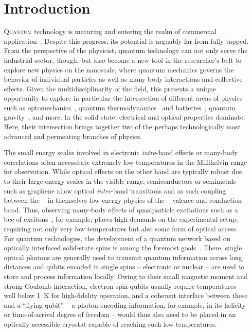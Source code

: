 \chapter{Introduction}\label{ch:setup:introduction}
\lettrine[lines=3,lhang=0.33,loversize=0.25,depth=1]{Q}{uantum} technology is maturing and entering the realm of commercial application~\cite{Schleich2016,Mohseni2017,QTBMBF,QTCEN,QTEU}.
Despite this progress, its potential is arguably far from fully tapped.
From the perspective of the physicist, quantum technology can not only serve the industrial sector, though, but also become a new tool in the researcher's belt to explore new physics on the nanoscale, where quantum mechanics governs the behavior of individual particles as well as many-body interactions and collective effects.
Given the multidisciplinarity of the field, this presents a unique opportunity to explore in particular the intersection of different areas of physics such as optomechanics~\cite{Aspelmeyer2014,Barzanjeh2022}, quantum thermodynamics~\cite{Goold2016,Deffner2019,Cangemi2024} and batteries~\cite{Campaioli2024}, quantum gravity~\cite{Degen2017,Bass2024}, and more.
In the solid state, electrical and optical properties dominate.
Here, their intersection brings together two of the perhaps technologically most advanced and permeating branches of physics.

The small energy scales involved in electronic \emph{intra}-band effects or many-body correlations often necessitate extremely low temperatures in the Millikelvin range for observation.
While optical effects on the other hand are typically robust due to their large energy scales in the visible range,
semiconductors or semimetals such as graphene allow optical \emph{inter}-band transitions and as such coupling between the -- in themselves low-energy physics of the -- valence and conduction band.
Thus, observing many-body effects of quasiparticle excitations such as a \gls{bec} of excitons~\cite{Kohn1970,High2012,Combescot2017,Morita2022,Zhang2024}, for example, places high demands on the experimental setup, requiring not only very low temperatures but also some form of optical access.
For quantum technologies, the development of a quantum network based on optically interfaced solid-state spins is among the foremost goals~\cite{Awschalom2018,Azuma2023,Heindel2023,Zajac2025}.
There, single optical photons are generally used to transmit quantum information across long distances and qubits encoded in single spins -- electronic or nuclear -- are used to store and process information locally.
Owing to their small magnetic moment and strong Coulomb interaction, electron spin qubits usually require temperatures well below \qty{1}{\kelvin} for high-fidelity operation, and a coherent interface between these and a \enquote{flying qubit} -- a photon encoding information, for example, in its helicity or time-of-arrival degree of freedom -- would thus also need to be placed in an optically accessible cryostat capable of reaching such low temperatures.

